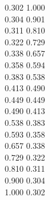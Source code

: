 \documentclass{article}
\begin{document}
{  0.302 1.000 \\ 0.304 0.901 \\ 0.311 0.810 \\ 0.322 0.729 \\ 0.338 0.657 \\ 0.358 0.594 \\ 0.383 0.538 \\ 0.413 0.490 \\
  0.449 0.449 \\ 0.490 0.413 \\ 0.538 0.383 \\ 0.593 0.358 \\ 0.657 0.338 \\ 0.729 0.322 \\ 0.810 0.311 \\ 0.900 0.304 \\
  1.000 0.302 \\
}\curvaxyeA%
\end{document}
